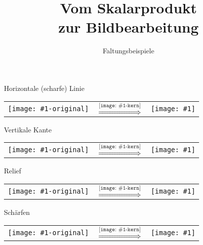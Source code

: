 \documentclass[ngerman, colors={mat},
]{URbeamer}
\title{Vom Skalarprodukt\\zur Bildbearbeitung}
\subtitle{Faltungsbeispiele}
\date{}
\institute{Fakultät für Mathematik}
\begin{document}
\frame[plain]{\titlepage}

\newcommand{\bildvergleich}[2]{
  \begin{frame}{#2}
    \centering
    \begin{tabularx}{\linewidth}{@{} X c X @{}}
      \parbox[c]{\linewidth}{
        \texttt{[image: \#1-original]}
      }
      &\parbox[c]{3em}{
        $\overset{
          \texttt{[image: \#1-kern]}
        }{
          \Longrightarrow
        }$
      }
      &\parbox[c]{\linewidth}{
        \texttt{[image: \#1]}
      }
    \end{tabularx}
  \end{frame}
}

\bildvergleich{horizontale_linie}{Horizontale (scharfe) Linie}
\bildvergleich{vertikale_kante-dunkel}{Vertikale Kante}
\bildvergleich{relief}{Relief}
\bildvergleich{schaerfen}{Schärfen}
\end{document}
